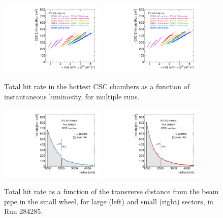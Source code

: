 \begin{figure}
  \begin{center}
    \includegraphics[width=0.45\textwidth]{./figures/rate_raw_vs_lumi_vs_evts_csc_CSL1_overlay.pdf}
    \includegraphics[width=0.45\textwidth]{./figures/rate_raw_vs_lumi_vs_evts_csc_CSS1_overlay.pdf}
    \caption{Total hit rate in the hottest CSC chambers as a function of instantaneous luminosity, for multiple runs.}
    \label{fig:hitrates-vs-lumi-csc-raw}
  \end{center}
\end{figure}

\begin{figure}
  \begin{center}
    \includegraphics[width=0.45\textwidth]{./figures/rate_raw_vs_r_L_00284285.pdf}
    \includegraphics[width=0.45\textwidth]{./figures/rate_raw_vs_r_S_00284285.pdf}
    \caption{Total hit rate as a function of the transverse distance from the beam pipe in the small wheel, for large (left) and small (right) sectors, in Run 284285.}
    \label{fig:hitrates-vs-r}
  \end{center}
\end{figure}

